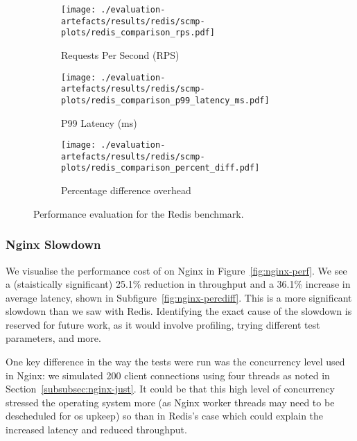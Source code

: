 \begin{figure}[htbp]
    \centering
    \begin{subfigure}[b]{\textwidth}
        \centering
        \texttt{[image: ./evaluation-artefacts/results/redis/scmp-plots/redis\_comparison\_rps.pdf]} 
        \caption{Requests Per Second (RPS)}
        \label{fig:redis-rps}
    \end{subfigure}
    \hfill
     \begin{subfigure}[b]{\textwidth}
        \centering
        \texttt{[image: ./evaluation-artefacts/results/redis/scmp-plots/redis\_comparison\_p99\_latency\_ms.pdf]} 
        \caption{P99 Latency (ms)}
        \label{fig:redis-p99}
    \end{subfigure}
    
     \medskip 
     \begin{subfigure}[b]{1.2\textwidth}
        \centering
        \texttt{[image: ./evaluation-artefacts/results/redis/scmp-plots/redis\_comparison\_percent\_diff.pdf]} %
        \caption{Percentage difference overhead}
        \label{fig:redis-percdiff}
    \end{subfigure}

    \caption{Performance evaluation for the Redis benchmark.}
    \label{fig:redis-perf}
\end{figure}

\subsubsection{Nginx Slowdown}\label{subsubsec:nginx-slowdown}

We visualise the performance cost of \af on Nginx in
Figure~\ref{fig:nginx-perf}. We see a (staistically significant) 25.1\%
reduction in throughput and a 36.1\% increase in average latency, shown in
Subfigure~\ref{fig:nginx-percdiff}. This is a more significant slowdown than
we saw with Redis. Identifying the exact cause of the slowdown is reserved
for future work, as it would involve profiling, trying different test
parameters, and more. 

One key difference in the way the tests were run was the concurrency level used
in Nginx: we simulated 200 client connections using four threads as noted in
Section~\ref{subsubsec:nginx-just}. It could be that this high level of
concurrency stressed the operating system more (as Nginx worker threads may need
to be descheduled for \ac{os} upkeep) so than in Redis's case which could
explain the increased latency and reduced throughput.

